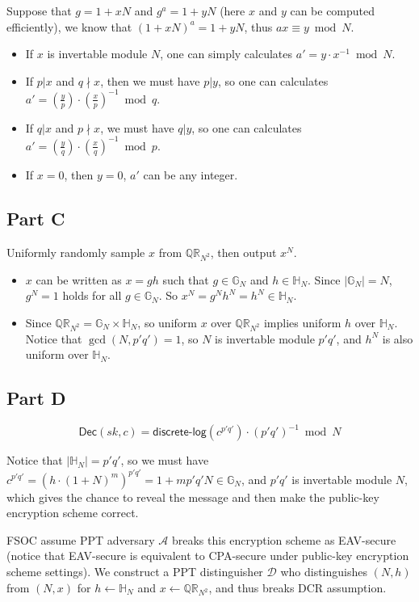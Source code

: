 \documentclass[8pt]{article}
\theoremstyle{compact}
\def\Dec{\textsf{Dec}}
\begin{document}
Suppose that $g = 1 + xN$ and $g^a = 1 + yN$ (here $x$ and $y$ can be computed efficiently), we know that $(1 + xN)^a = 1 + yN$, thus $ax \equiv y \bmod N$.
\begin{itemize}
	\item If $x$ is invertable module $N$, one can simply calculates $a' = y \cdot x^{-1} \bmod N$.
	\item If $p | x$ and $q \nmid x$, then we must have $p | y$, so one can calculates $a' = \left(\frac yp\right) \cdot \left(\frac xp\right)^{-1} \bmod q$.
	\item If $q | x$ and $p \nmid x$, we must have $q | y$, so one can calculates $a' = \left(\frac yq\right) \cdot \left(\frac xq\right)^{-1} \bmod p$.
	\item If $x = 0$, then $y = 0$, $a'$ can be any integer.
\end{itemize}

\subsection*{Part C}
Uniformly randomly sample $x$ from $\mathbb{QR}_{N^2}$, then output $x^N$.

\begin{itemize}
	\item $x$ can be written as $x = gh$ such that $g \in \mathbb G_N$ and $h \in \mathbb H_N$. Since $|\mathbb G_N| = N$, $g^N = 1$ holds for all $g \in \mathbb G_N$. So $x^N = g^Nh^N = h^N \in \mathbb H_N$.
	\item Since $\mathbb{QR}_{N^2} = \mathbb G_N \times \mathbb H_N$, so uniform $x$ over $\mathbb{QR}_{N^2}$ implies uniform $h$ over $\mathbb H_N$. Notice that $\gcd(N, p'q') = 1$, so $N$ is invertable module $p'q'$, and $h^N$ is also uniform over $\mathbb H_N$.
\end{itemize}

\subsection*{Part D}
$$\Dec(sk, c) = \textsf{discrete-log}(c^{p'q'}) \cdot (p'q')^{-1} \bmod N$$

Notice that $|\mathbb H_N| = p'q'$, so we must have $c^{p'q'} = (h \cdot (1 + N)^m)^{p'q'} = 1 + mp'q'N\in \mathbb G_N$, and $p'q'$ is invertable module $N$, which gives the chance to reveal the message and then make the public-key encryption scheme correct.

FSOC assume PPT adversary $\mathcal A$ breaks this encryption scheme as EAV-secure (notice that EAV-secure is equivalent to CPA-secure under public-key encryption scheme settings). We construct a PPT distinguisher $\mathcal D$ who distinguishes $(N, h)$ from $(N, x)$ for $h \gets \mathbb H_N$ and $x \gets \mathbb{QR}_{N^2}$, and thus breaks DCR assumption.
\end{document}
